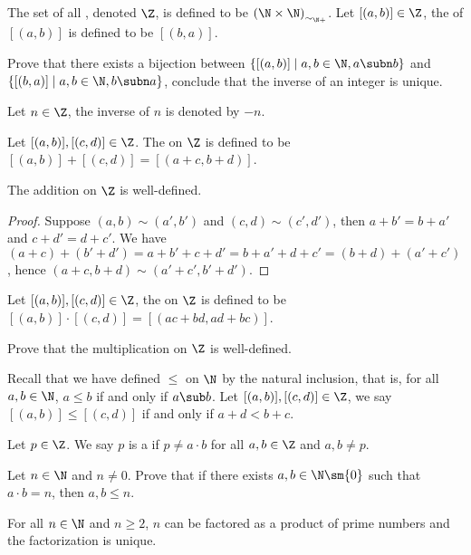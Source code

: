 \documentclass[10pt]{article}
\begin{document}
\begin{definition}
    The set of all , denoted $\Z$, is defined to be ${(\N\times{\N})}_{{\sim}_{\N+}}$. Let $[(a,b)]\in\Z$, the  of $[(a,b)]$ is defined to be $[(b,a)]$.
\end{definition}
\begin{problem}
    Prove that there exists a bijection between $\{[(a,b)]\mid a,b\in\N, a\subn b\}$ and $\{[(b,a)]\mid a,b\in\N, b\subn a\}$, conclude that the inverse of an integer is unique.
\end{problem}
\par
Let $n\in\Z$, the inverse of $n$ is denoted by $-n$.
\begin{definition}
    Let $[(a,b)],[(c,d)]\in\Z$. The  on $\Z$ is defined to be $[(a,b)]+[(c,d)]=[(a+c,b+d)]$.
\end{definition}
\begin{proposition}
    The addition on $\Z$ is well-defined.
\end{proposition}
\begin{proof}
    Suppose $(a,b)\sim(a',b')$ and $(c,d)\sim(c',d')$, then $a+b'=b+a'$ and $c+d'=d+c'$. We have $(a+c)+(b'+d')=a+b'+c+d'=b+a'+d+c'=(b+d)+(a'+c')$, hence $(a+c,b+d)\sim(a'+c',b'+d')$.
\end{proof}
\begin{definition}
    Let $[(a,b)],[(c,d)]\in\Z$, the  on $\Z$ is defined to be $[(a,b)]\cdot[(c,d)]=[(ac+bd,ad+bc)]$.
\end{definition}
\begin{problem}
    Prove that the multiplication on $\Z$ is well-defined.
\end{problem}
\par
Recall that we have defined $\le$ on $\N$ by the natural inclusion, that is, for all $a,b\in\N$, $a\le b$ if and only if $a\sub b$. Let $[(a,b)],[(c,d)]\in\Z$, we say $[(a,b)]\le[(c,d)]$ if and only if $a+d<b+c$.
\begin{definition}
    Let $p\in\Z$. We say $p$ is a  if $p\ne a\cdot b$ for all $a,b\in\Z$ and $a,b\ne p$.
\end{definition}
\begin{problem}
    Let $n\in\N$ and $n\ne 0$. Prove that if there exists $a,b\in\N\sm\{0\}$ such that $a\cdot b=n$, then $a,b\le n$.
\end{problem}
\begin{theorem}
    For all $n\in\N$ and $n\ge 2$, $n$ can be factored as a product of prime numbers and the factorization is unique.
\end{theorem}
\end{document}
